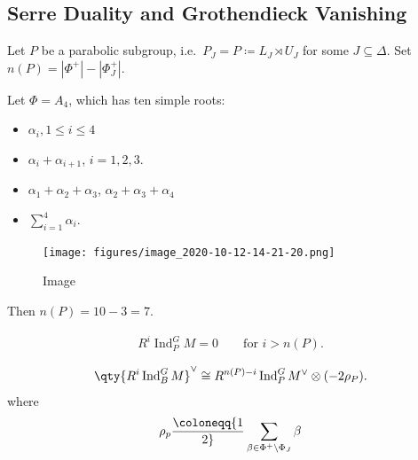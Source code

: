 \hypertarget{serre-duality-and-grothendieck-vanishing}{%
\subsection{Serre Duality and Grothendieck
Vanishing}\label{serre-duality-and-grothendieck-vanishing}}

Let \(P\) be a parabolic subgroup,
i.e.~\(P_J = P \coloneqq L_J \rtimes U_J\) for some
\(J\subseteq \Delta\). Set
\(n(P) = {\left\lvert {\Phi^+} \right\rvert} - {\left\lvert {\Phi^+_J} \right\rvert}\).

\begin{example}

Let \(\Phi = A_4\), which has ten simple roots:

\begin{itemize}
\tightlist
\item
  \(\alpha_i, 1\leq i \leq 4\)
\item
  \(\alpha_i + \alpha_{i+1}\), \(i=1,2,3\).
\item
  \(\alpha_1 + \alpha_2 +\alpha_3\), \(\alpha_2 + \alpha_3 + \alpha_4\)
\item
  \(\sum_{i=1}^4 \alpha_i\).
\end{itemize}

\begin{figure}
\centering
\texttt{[image: figures/image\_2020-10-12-14-21-20.png]}
\caption{Image}
\end{figure}

Then \(n(P) = 10 - 3 = 7\).

\end{example}

\begin{theorem}

\begin{align*}  
R^i \operatorname{Ind}_P^G M = 0 \qquad \text{for } i > n(P)
.\end{align*}

\end{theorem}

\begin{theorem}

\begin{align*}  
\qty{ R^i \operatorname{Ind}_B^G M }^\vee\cong R^{n(P) -i} \operatorname{Ind}_P^G M^\vee\otimes(-2\rho_P)
.\end{align*}
where
\begin{align*}
\rho_p \coloneqq{1\over 2}\sum_{\beta \in \Phi^+ \setminus\Phi_J} \beta
\end{align*}

\end{theorem}

